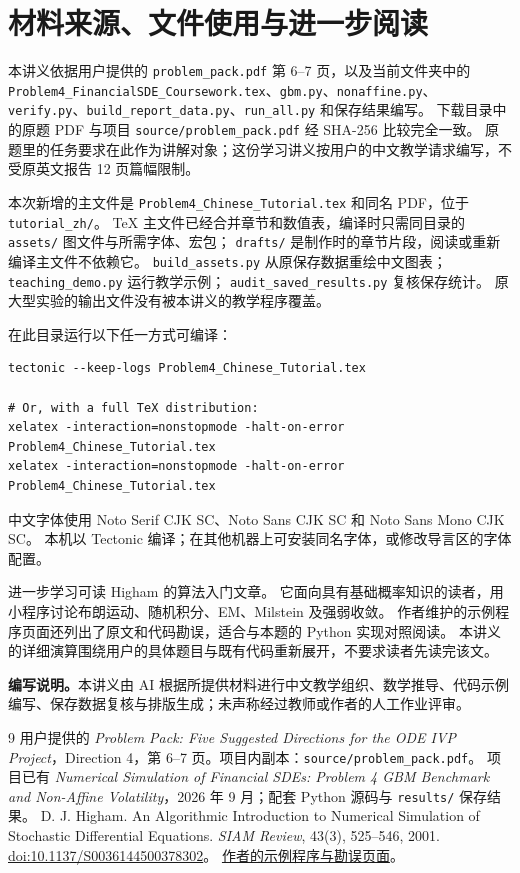 \section{材料来源、文件使用与进一步阅读}\label{sec:sources}
本讲义依据用户提供的 \texttt{problem\_pack.pdf} 第 6--7 页，以及当前文件夹中的
\nolinkurl{Problem4_FinancialSDE_Coursework.tex}、\texttt{gbm.py}、\texttt{nonaffine.py}、
\texttt{verify.py}、\texttt{build\_report\_data.py}、\texttt{run\_all.py} 和保存结果编写。
下载目录中的原题 PDF 与项目 \texttt{source/problem\_pack.pdf} 经 SHA-256 比较完全一致。
原题里的任务要求在此作为讲解对象；这份学习讲义按用户的中文教学请求编写，不受原英文报告 12 页篇幅限制。

本次新增的主文件是 \texttt{Problem4\_Chinese\_Tutorial.tex} 和同名 PDF，位于 \texttt{tutorial\_zh/}。
TeX 主文件已经合并章节和数值表，编译时只需同目录的 \texttt{assets/} 图文件与所需字体、宏包；
\texttt{drafts/} 是制作时的章节片段，阅读或重新编译主文件不依赖它。
\texttt{build\_assets.py} 从原保存数据重绘中文图表；\texttt{teaching\_demo.py} 运行教学示例；
\texttt{audit\_saved\_results.py} 复核保存统计。
原大型实验的输出文件没有被本讲义的教学程序覆盖。

在此目录运行以下任一方式可编译：
\begin{lstlisting}[language={}]
tectonic --keep-logs Problem4_Chinese_Tutorial.tex

# Or, with a full TeX distribution:
xelatex -interaction=nonstopmode -halt-on-error Problem4_Chinese_Tutorial.tex
xelatex -interaction=nonstopmode -halt-on-error Problem4_Chinese_Tutorial.tex
\end{lstlisting}
中文字体使用 Noto Serif CJK SC、Noto Sans CJK SC 和 Noto Sans Mono CJK SC。
本机以 Tectonic 编译；在其他机器上可安装同名字体，或修改导言区的字体配置。

进一步学习可读 Higham 的算法入门文章\cite{higham}。
它面向具有基础概率知识的读者，用小程序讨论布朗运动、随机积分、EM、Milstein 及强弱收敛。
作者维护的示例程序页面还列出了原文和代码勘误，适合与本题的 Python 实现对照阅读。
本讲义的详细演算围绕用户的具体题目与既有代码重新展开，不要求读者先读完该文。

\noindent\textbf{编写说明。}本讲义由 AI 根据所提供材料进行中文教学组织、数学推导、代码示例编写、保存数据复核与排版生成；未声称经过教师或作者的人工作业评审。

\begin{thebibliography}{9}
 用户提供的 \emph{Problem Pack: Five Suggested Directions for the ODE IVP Project}，Direction 4，第 6--7 页。项目内副本：\texttt{source/problem\_pack.pdf}。
 项目已有 \emph{Numerical Simulation of Financial SDEs: Problem 4 GBM Benchmark and Non-Affine Volatility}，2026 年 9 月；配套 Python 源码与 \texttt{results/} 保存结果。
 D. J. Higham. An Algorithmic Introduction to Numerical Simulation of Stochastic Differential Equations. \emph{SIAM Review}, 43(3), 525--546, 2001.
\href{https://doi.org/10.1137/S0036144500378302}{doi:10.1137/S0036144500378302}。
\href{https://webhomes.maths.ed.ac.uk/~dhigham/algfiles.html}{作者的示例程序与勘误页面}。
\end{thebibliography}

